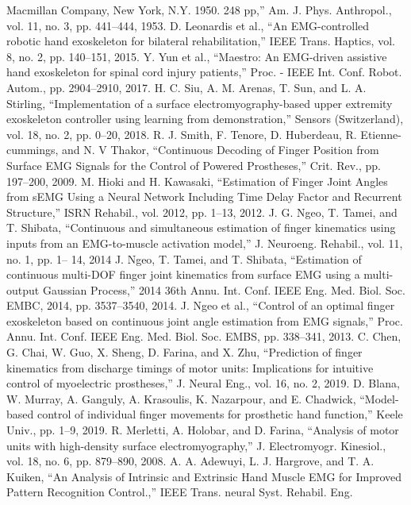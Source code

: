 \documentclass[conference]{IEEEtran}
\begin{document}
\begin{thebibliography}{00}
Macmillan Company, New York, N.Y. 1950. 248 pp,” Am. J. Phys. Anthropol., vol. 11, no. 3, pp. 
441–444, 1953.
 D. Leonardis et al., “An EMG-controlled robotic hand exoskeleton for bilateral rehabilitation,” IEEE 
Trans. Haptics, vol. 8, no. 2, pp. 140–151, 2015.
 Y. Yun et al., “Maestro: An EMG-driven assistive hand exoskeleton for spinal cord injury patients,” 
Proc. - IEEE Int. Conf. Robot. Autom., pp. 2904–2910, 2017.
 H. C. Siu, A. M. Arenas, T. Sun, and L. A. Stirling, “Implementation of a surface electromyography-based upper extremity exoskeleton controller using learning from demonstration,” Sensors 
(Switzerland), vol. 18, no. 2, pp. 0–20, 2018.
 R. J. Smith, F. Tenore, D. Huberdeau, R. Etienne-cummings, and N. V Thakor, “Continuous Decoding 
of Finger Position from Surface EMG Signals for the Control of Powered Prostheses,” Crit. Rev., pp. 
197–200, 2009.
 M. Hioki and H. Kawasaki, “Estimation of Finger Joint Angles from sEMG Using a Neural Network 
Including Time Delay Factor and Recurrent Structure,” ISRN Rehabil., vol. 2012, pp. 1–13, 2012.
 J. G. Ngeo, T. Tamei, and T. Shibata, “Continuous and simultaneous estimation of finger kinematics 
using inputs from an EMG-to-muscle activation model,” J. Neuroeng. Rehabil., vol. 11, no. 1, pp. 1–
14, 2014
 J. Ngeo, T. Tamei, and T. Shibata, “Estimation of continuous multi-DOF finger joint kinematics from 
surface EMG using a multi-output Gaussian Process,” 2014 36th Annu. Int. Conf. IEEE Eng. Med. 
Biol. Soc. EMBC, 2014, pp. 3537–3540, 2014.
 J. Ngeo et al., “Control of an optimal finger exoskeleton based on continuous joint angle estimation 
from EMG signals,” Proc. Annu. Int. Conf. IEEE Eng. Med. Biol. Soc. EMBS, pp. 338–341, 2013.
 C. Chen, G. Chai, W. Guo, X. Sheng, D. Farina, and X. Zhu, “Prediction of finger kinematics from 
discharge timings of motor units: Implications for intuitive control of myoelectric prostheses,” J. 
Neural Eng., vol. 16, no. 2, 2019.
 D. Blana, W. Murray, A. Ganguly, A. Krasoulis, K. Nazarpour, and E. Chadwick, “Model-based 
control of individual finger movements for prosthetic hand function,” Keele Univ., pp. 1–9, 2019.
 R. Merletti, A. Holobar, and D. Farina, “Analysis of motor units with high-density surface 
electromyography,” J. Electromyogr. Kinesiol., vol. 18, no. 6, pp. 879–890, 2008.
 A. A. Adewuyi, L. J. Hargrove, and T. A. Kuiken, “An Analysis of Intrinsic and Extrinsic Hand 
Muscle EMG for Improved Pattern Recognition Control.,” IEEE Trans. neural Syst. Rehabil. Eng. 

\end{thebibliography}
\end{document}
